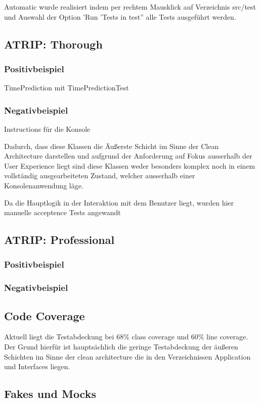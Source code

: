 Automatic wurde realisiert indem per rechtem Mausklick auf Verzeichnis src/test und Auswahl der Option 'Run 'Tests in test'' alle Tests ausgeführt werden.

\subsection{ATRIP: Thorough}

\subsubsection{Positivbeispiel}
TimePrediction mit TimePredictionTest %

\subsubsection{Negativbeispiel}
Instructions für die Konsole

Dadurch, dass diese Klassen die Äußerste Schicht im Sinne der Clean Architecture darstellen und aufgrund der Anforderung auf Fokus ausserhalb der User Experience liegt sind diese Klassen weder besonders komplex noch in einem vollständig ausgearbeiteten Zustand, welcher ausserhalb einer Konsolenanwendung läge.

Da die Hauptlogik in der Interaktion mit dem Benutzer liegt, wurden hier manuelle acceptence Tests angewandt %

\subsection{ATRIP: Professional}

\subsubsection{Positivbeispiel}

\subsubsection{Negativbeispiel}

\subsection{Code Coverage}
Aktuell liegt die Testabdeckung bei 68\% class coverage und 60\% line coverage. Der Grund hierfür ist hauptsächlich die geringe Testabdeckung der äußeren Schichten im Sinne der clean architecture die in den Verzeichnissen Application und Interfaces liegen.

\subsection{Fakes und Mocks}
